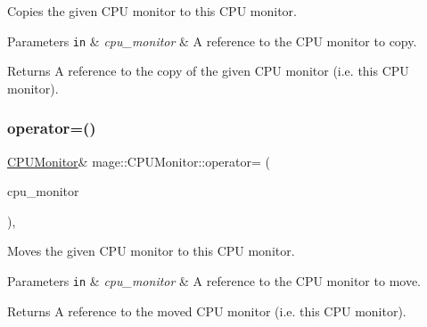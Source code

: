 Copies the given C\+PU monitor to this C\+PU monitor.


\begin{DoxyParams}[1]{Parameters}
\mbox{\tt in}  & {\em cpu\+\_\+monitor} & A reference to the C\+PU monitor to copy. \\
\hline
\end{DoxyParams}
\begin{DoxyReturn}{Returns}
A reference to the copy of the given C\+PU monitor (i.\+e. this C\+PU monitor). 
\end{DoxyReturn}
\mbox{\label{classmage_1_1_c_p_u_monitor_af1eacba414b2db72cf13d335f78785cd}} 
\subsubsection{\texorpdfstring{operator=()}{operator=()}\hspace{0.1cm}{\footnotesize\ttfamily [2/2]}}
{\footnotesize\ttfamily \mbox{\hyperlink{classmage_1_1_c_p_u_monitor}{C\+P\+U\+Monitor}}\& mage\+::\+C\+P\+U\+Monitor\+::operator= (\begin{DoxyParamCaption}\item[{\mbox{\hyperlink{classmage_1_1_c_p_u_monitor}{C\+P\+U\+Monitor}} \&\&}]{cpu\+\_\+monitor }\end{DoxyParamCaption})\hspace{0.3cm}{\ttfamily [default]}, {\ttfamily [noexcept]}}

Moves the given C\+PU monitor to this C\+PU monitor.


\begin{DoxyParams}[1]{Parameters}
\mbox{\tt in}  & {\em cpu\+\_\+monitor} & A reference to the C\+PU monitor to move. \\
\hline
\end{DoxyParams}
\begin{DoxyReturn}{Returns}
A reference to the moved C\+PU monitor (i.\+e. this C\+PU monitor). 
\end{DoxyReturn}
\mbox{\label{classmage_1_1_c_p_u_monitor_ab8b04a64545df631be0f40a54cc49e03}} 
